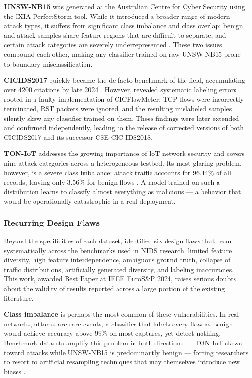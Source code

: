 \documentclass[conference]{IEEEtran}
\begin{document}
\textbf{UNSW-NB15} \cite{moustafa2015} was generated at the
Australian Centre for Cyber Security using the IXIA PerfectStorm
tool. While it introduced a broader range of modern attack types,
it suffers from significant class imbalance and class overlap:
benign and attack samples share feature regions that are difficult
to separate, and certain attack categories are severely
underrepresented \cite{zoghi2024}. These two issues compound
each other, making any classifier trained on raw UNSW-NB15 prone
to boundary misclassification.

\textbf{CICIDS2017} \cite{sharafaldin2018} quickly became the
de facto benchmark of the field, accumulating over 4200 citations
by late 2024 \cite{concap2026}. However, \textcite{engelen2021}
revealed systematic labeling errors rooted in a faulty
implementation of CICFlowMeter: TCP flows were incorrectly
terminated, RST packets were ignored, and the resulting mislabeled
samples silently skew any classifier trained on them. These
findings were later extended and confirmed independently, leading
to the release of corrected versions of both CICIDS2017 and its
successor CSE-CIC-IDS2018.

\textbf{TON-IoT} \cite{alsaedi2020} addresses the growing
importance of IoT network security and covers nine attack
categories across a heterogeneous testbed. Its most glaring
problem, however, is a severe class imbalance: attack traffic
accounts for 96.44\% of all records, leaving only 3.56\% for
benign flows \cite{dinh2026}. A model trained on such a
distribution learns to classify almost everything as malicious
--- a behavior that would be operationally catastrophic in a
real deployment.

\subsubsection{Recurring Design Flaws}

Beyond the specificities of each dataset, \textcite{flood2024}
identified six design flaws that recur systematically across
the benchmarks used in NIDS research: limited feature diversity,
high feature interdependence, ambiguous ground truth, collapse
of traffic distributions, artificially generated diversity, and
labeling inaccuracies. This work, awarded Best Paper at IEEE
EuroS\&P 2024, raises serious doubts about the validity of
results reported across a large portion of the existing
literature.

\textbf{Class imbalance} is perhaps the most common of these
vulnerabilities. In real networks, attacks are rare events, a classifier
that labels every flow as benign would achieve accuracy above
99\% on most captures, yet detect nothing. Benchmark datasets
amplify this problem in both directions --- TON-IoT skews
toward attacks while UNSW-NB15 is predominantly benign ---
forcing researchers to resort to artificial resampling techniques
that may themselves introduce new biases \cite{dinh2026}.
\end{document}
